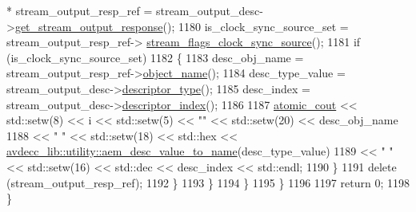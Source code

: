 \begin{DoxyCode}
       * stream\_output\_resp\_ref = stream\_output\_desc->\hyperlink{classavdecc__lib_1_1stream__output__descriptor_af92b70610c451a7f1eefcb71b3d97eb8}{get\_stream\_output\_response}();
1180                     is\_clock\_sync\_source\_set = stream\_output\_resp\_ref->
      \hyperlink{classavdecc__lib_1_1stream__output__descriptor__response_a995e03199cdf8ff67b735e202ee731c9}{stream\_flags\_clock\_sync\_source}();
1181                     \textcolor{keywordflow}{if} (is\_clock\_sync\_source\_set)
1182                     \{
1183                         desc\_obj\_name = stream\_output\_resp\_ref->\hyperlink{classavdecc__lib_1_1descriptor__response__base_a133f7774946d80f82b8aaaa4cfbb7361}{object\_name}();
1184                         desc\_type\_value = stream\_output\_desc->\hyperlink{classavdecc__lib_1_1descriptor__base_a5112b70022171063ec5d3242bee9910e}{descriptor\_type}();
1185                         desc\_index = stream\_output\_desc->\hyperlink{classavdecc__lib_1_1descriptor__base_a7eed5583bffdf72d89021b188648c1b5}{descriptor\_index}();
1186 
1187                         \hyperlink{cmd__line_8h_a0bc38ccc65c79ba06c6fcd7b4bf554c3}{atomic\_cout} << std::setw(8) << i << std::setw(5) << \textcolor{stringliteral}{""} << std::setw(20) 
      << desc\_obj\_name
1188                                     << \textcolor{stringliteral}{"  "} << std::setw(18) << std::hex << 
      \hyperlink{namespaceavdecc__lib_1_1utility_a6bdd02679e5a911a071d4aa03be341f0}{avdecc\_lib::utility::aem\_desc\_value\_to\_name}(desc\_type\_value)
1189                                     << \textcolor{stringliteral}{"  "} << std::setw(16) << std::dec << desc\_index << std::endl;
1190                     \}
1191                     \textcolor{keyword}{delete} (stream\_output\_resp\_ref);
1192                 \}
1193             \}
1194         \}
1195     \}
1196 
1197     \textcolor{keywordflow}{return} 0;
1198 \}
\end{DoxyCode}


